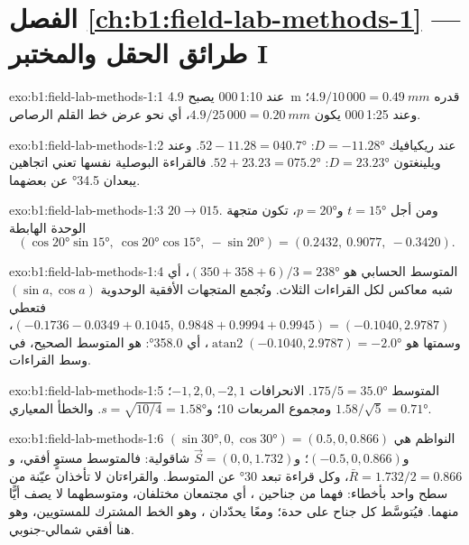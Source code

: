 \section*{الفصل \ref{ch:b1:field-lab-methods-1} --- طرائق الحقل والمختبر I}

\begin{solution}{exo:b1:field-lab-methods-1:1}
عند 1:10\,000 يصبح \qty{4.9}{m} قدره $4.9/10\,000 = \qty{0.49}{mm}$؛ وعند 1:25\,000 يكون $4.9/25\,000 = \qty{0.20}{mm}$، أي نحو عرض خط القلم الرصاص.
\end{solution}

\begin{solution}{exo:b1:field-lab-methods-1:2}
عند ريكيافيك $D = \ang{-11.28}$: $52 - 11.28 = \ang{040.7}$. وعند ويلينغتون $D = \ang{+23.23}$: $52 + 23.23 = \ang{075.2}$. فالقراءة البوصلية نفسها تعني اتجاهين يبعدان \ang{34.5} عن بعضهما.
\end{solution}

\begin{solution}{exo:b1:field-lab-methods-1:3}
$20\to015$. ومن أجل $t = \ang{15}$ و$p = \ang{20}$، تكون متجهة الوحدة الهابطة
\[
  (\cos\ang{20}\sin\ang{15},\ \cos\ang{20}\cos\ang{15},\ -\sin\ang{20}) =
  (0.2432,\ 0.9077,\ -0.3420).
\]
\end{solution}

\begin{solution}{exo:b1:field-lab-methods-1:4}
المتوسط الحسابي هو $(350 + 358 + 6)/3 = \ang{238}$، أي شبه معاكس لكل القراءات الثلاث. وتُجمع المتجهات الأفقية الوحدوية $(\sin a, \cos a)$ فتعطي
$(-0.1736 - 0.0349 + 0.1045,\ 0.9848 + 0.9994 + 0.9945) = (-0.1040, 2.9787)$،
وسمتها هو $\operatorname{atan2}(-0.1040, 2.9787) = \ang{-2.0}$، أي \ang{358.0}: هو المتوسط الصحيح، في وسط القراءات.
\end{solution}

\begin{solution}{exo:b1:field-lab-methods-1:5}
المتوسط $175/5 = \ang{35.0}$. الانحرافات $-1, 2, 0, -2, 1$؛ ومجموع المربعات 10؛ و$s = \sqrt{10/4} = \ang{1.58}$. والخطأ المعياري $1.58/\sqrt5 = \ang{0.71}$.
\end{solution}

\begin{solution}{exo:b1:field-lab-methods-1:6}
النواظم هي $(\sin\ang{30}, 0, \cos\ang{30}) = (0.5, 0, 0.866)$ و$(-0.5, 0, 0.866)$؛ و$\vec S = (0, 0, 1.732)$ شاقولية: فالمتوسط مستوٍ أفقي، و$\bar R = 1.732/2 = 0.866$، وكل قراءة تبعد \ang{30} عن المتوسط. والقراءتان لا تأخذان عيّنة من سطح واحد بأخطاء: فهما من جناحين ، أي مجتمعان مختلفان، ومتوسطهما لا يصف أيًّا منهما. فيُتوسَّط كل جناح على حدة؛ ومعًا يحدّدان ، وهو الخط المشترك للمستويين، وهو هنا أفقي شمالي-جنوبي.
\end{solution}

